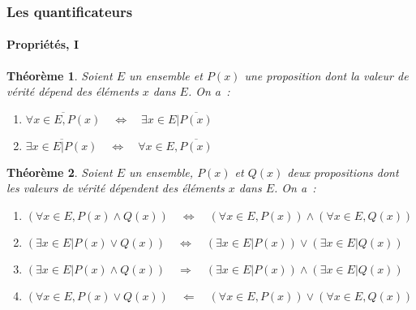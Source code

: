 \documentclass[10pt,notheorems]{beamer}
\theoremstyle{plain}
\newtheorem{theorem}{Théorème}
\theoremstyle{definition} %
\begin{document}
\begin{frame}
  \frametitle{Les quantificateurs}
  \framesubtitle{Propriétés, I}
  \hypertarget{slide_quantificateur_proprietes_1}{}

  \begin{theorem}\label{thm:quantificateurs_negation}
    Soient $E$ un ensemble et $P(x)$ une proposition dont la valeur de vérité dépend des éléments $x$ dans $E$. On a~:
    \begin{enumerate}
    \item $\overline{\forall x\in E, P(x)} \quad \Leftrightarrow \quad \exists x\in E| \overline{P(x)}$
    \item $\overline{\exists x\in E| P(x)} \quad \Leftrightarrow \quad \forall x\in E, \overline{P(x)}$
    \end{enumerate}
  \end{theorem}

  \begin{theorem}\label{thm:quantificateurs_arithmetic_1}
    Soient $E$ un ensemble, $P(x)$ et $Q(x)$ deux propositions dont les valeurs de vérité dépendent des éléments $x$ dans $E$. On a~:
    \begin{enumerate}
    \item $(\forall x\in E, P(x) \land Q(x)) \quad \Leftrightarrow \quad (\forall x\in E, P(x)) \land (\forall x\in E, Q(x))$
    \item $(\exists x\in E| P(x) \lor Q(x)) \quad \Leftrightarrow \quad (\exists x\in E| P(x)) \lor (\exists x\in E| Q(x))$
    \item $(\exists x\in E| P(x) \land Q(x)) \quad \Rightarrow \quad (\exists x\in E| P(x)) \land (\exists x\in E| Q(x))$
    \item $(\forall x\in E, P(x) \lor Q(x)) \quad \Leftarrow \quad (\forall x\in E, P(x)) \lor (\forall x\in E, Q(x))$

    \end{enumerate}

  \end{theorem}

\end{frame}
\end{document}
